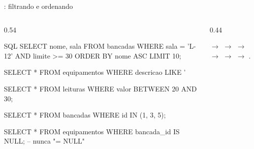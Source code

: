 \documentclass[aspectratio=169,10pt]{beamer}
\begin{document}
\begin{frame}[fragile]{: filtrando e ordenando}
  \begin{columns}[T]
    \begin{column}{0.54\textwidth}
\begin{codigo}[title=Consultas básicas]{SQL}
SELECT nome, sala
FROM   bancadas
WHERE  sala = 'L-12' AND limite >= 30
ORDER  BY nome ASC
LIMIT  10;

SELECT * FROM equipamentos
WHERE  descricao LIKE '%

SELECT * FROM leituras
WHERE  valor BETWEEN 20 AND 30;

SELECT * FROM bancadas WHERE id IN (1, 3, 5);

SELECT * FROM equipamentos
WHERE  bancada_id IS NULL;   -- nunca "= NULL"
\end{codigo}
    \end{column}
    \begin{column}{0.44\textwidth}
      \centering
      \begin{dica}
         $\rightarrow$  $\rightarrow$  $\rightarrow$  $\rightarrow$  $\rightarrow$  $\rightarrow$ .
      \end{dica}
    \end{column}
  \end{columns}
\end{frame}
\end{document}
